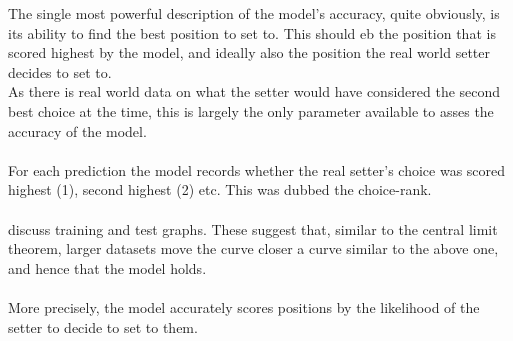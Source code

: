 \documentclass[main.tex]{subfiles}
\begin{document}
        The single most powerful description of the model's accuracy, quite obviously, is its ability to find the best position to set to. This should eb the position that is scored highest by the model, and ideally also the position the real world setter decides to set to.\\
        As there is real world data on what the setter would have considered the second best choice at the time, this is largely the only parameter available to asses the accuracy of the model.
        \\\\
        For each prediction the model records whether the real setter's choice was scored highest (1), second highest (2) etc. This was dubbed the choice-rank.  
        \\\\
        discuss training and test graphs. These suggest that, similar to the central limit theorem, larger datasets move the curve closer a curve similar to the above one, and hence that the model holds.
        \\\\
        More precisely, the model accurately scores positions by the likelihood of the setter to decide to set to them.
        \\\\
\end{document}
